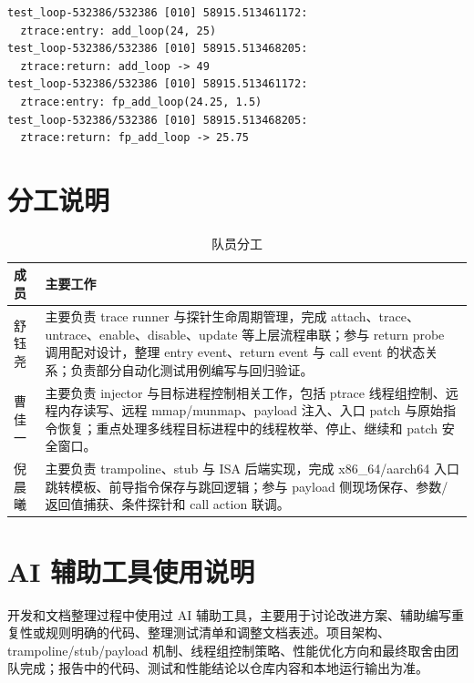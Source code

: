 \documentclass[UTF8,a4paper,11pt,fontset=fandol]{ctexart}
\begin{document}
\begin{lstlisting}
test_loop-532386/532386 [010] 58915.513461172:
  ztrace:entry: add_loop(24, 25)
test_loop-532386/532386 [010] 58915.513468205:
  ztrace:return: add_loop -> 49
test_loop-532386/532386 [010] 58915.513461172:
  ztrace:entry: fp_add_loop(24.25, 1.5)
test_loop-532386/532386 [010] 58915.513468205:
  ztrace:return: fp_add_loop -> 25.75
\end{lstlisting}

\section{分工说明}

\begin{table}[H]
\centering
\caption{队员分工}
\begin{tabularx}{\textwidth}{P{2.4cm}Y}
\toprule
\textbf{成员} & \textbf{主要工作}\\
\midrule
舒钰尧 & 主要负责 trace runner 与探针生命周期管理，完成 attach、trace、untrace、enable、disable、update 等上层流程串联；参与 return probe 调用配对设计，整理 entry event、return event 与 call event 的状态关系；负责部分自动化测试用例编写与回归验证。\\
曹佳一 & 主要负责 injector 与目标进程控制相关工作，包括 ptrace 线程组控制、远程内存读写、远程 mmap/munmap、payload 注入、入口 patch 与原始指令恢复；重点处理多线程目标进程中的线程枚举、停止、继续和 patch 安全窗口。\\
倪晨曦 & 主要负责 trampoline、stub 与 ISA 后端实现，完成 x86\_64/aarch64 入口跳转模板、前导指令保存与跳回逻辑；参与 payload 侧现场保存、参数/返回值捕获、条件探针和 call action 联调。\\
\bottomrule
\end{tabularx}
\end{table}

\section{AI 辅助工具使用说明}

开发和文档整理过程中使用过 AI 辅助工具，主要用于讨论改进方案、辅助编写重复性或规则明确的代码、整理测试清单和调整文档表述。项目架构、trampoline/stub/payload 机制、线程组控制策略、性能优化方向和最终取舍由团队完成；报告中的代码、测试和性能结论以仓库内容和本地运行输出为准。
\end{document}
